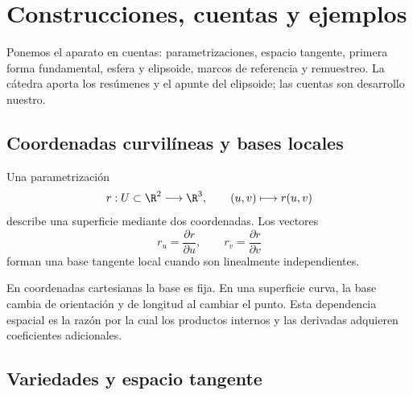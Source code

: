 \section{Construcciones, cuentas y ejemplos}


Ponemos el aparato en cuentas: parametrizaciones, espacio tangente, primera forma fundamental, esfera y elipsoide, marcos de referencia y remuestreo. La cátedra aporta los resúmenes y el apunte del elipsoide; las cuentas son desarrollo nuestro.

\subsection{Coordenadas curvilíneas y bases locales}\label{sec:curvilineas}

Una parametrización
\[
  r:U\subset\R^2\longrightarrow\R^3,
  \qquad
  (u,v)\longmapsto r(u,v)
\]
describe una superficie mediante dos coordenadas. Los vectores
\[
  r_u=\frac{\partial r}{\partial u},
  \qquad
  r_v=\frac{\partial r}{\partial v}
\]
forman una base tangente local cuando son linealmente independientes.

\begin{center}
\end{center}

En coordenadas cartesianas la base es fija. En una superficie curva, la base cambia de
orientación y de longitud al cambiar el punto. Esta dependencia espacial es la razón por la
cual los productos internos y las derivadas adquieren coeficientes adicionales.

\subsection{Variedades y espacio tangente}\label{sec:variedades}

